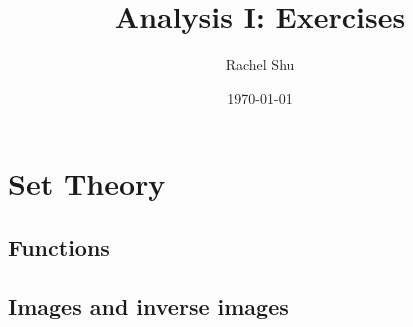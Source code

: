 \documentclass[notitlepage]{report}
\title{Analysis I: Exercises}
\author{Rachel Shu}
\date{\today}
\newif\ifmainfile
\begin{document}
\mainfiletrue

\maketitle
\tableofcontents

\addtocounter{chapter}{2}
\chapter{Set Theory}

\addtocounter{section}{2}
\section{Functions}\label{3.3}

\section{Images and inverse images}\label{3.4}

\end{document}
